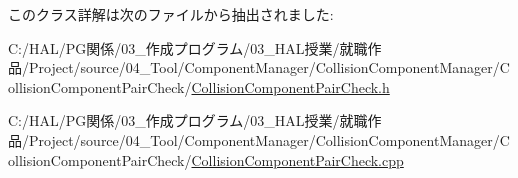 このクラス詳解は次のファイルから抽出されました\+:\begin{DoxyCompactItemize}
\item 
C\+:/\+H\+A\+L/\+P\+G関係/03\+\_\+作成プログラム/03\+\_\+\+H\+A\+L授業/就職作品/\+Project/source/04\+\_\+\+Tool/\+Component\+Manager/\+Collision\+Component\+Manager/\+Collision\+Component\+Pair\+Check/\mbox{\hyperlink{_collision_component_pair_check_8h}{Collision\+Component\+Pair\+Check.\+h}}\item 
C\+:/\+H\+A\+L/\+P\+G関係/03\+\_\+作成プログラム/03\+\_\+\+H\+A\+L授業/就職作品/\+Project/source/04\+\_\+\+Tool/\+Component\+Manager/\+Collision\+Component\+Manager/\+Collision\+Component\+Pair\+Check/\mbox{\hyperlink{_collision_component_pair_check_8cpp}{Collision\+Component\+Pair\+Check.\+cpp}}\end{DoxyCompactItemize}
